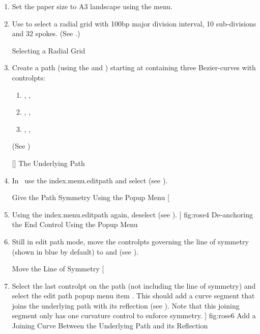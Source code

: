 \begin{enumerate}
  \item Set the paper size to A3 landscape using the
   menu.

  \item Use  to select a
   radial grid with 100\gls{bp} major division interval, 10 sub-divisions and
   32 spokes. (See .)

  {}
  {Selecting a Radial Grid}

  \item Create a \gls{path} (using the 
  and \editpathmode) starting at 
  containing three \glspl{Bezier-curve} with  \glspl{controlpt}:
  \begin{enumerate}
    \item {}, , 
    \item {}, , 
    \item {}, , 
  \end{enumerate}
  (See )

[]
{}
{The Underlying Path}

  \item In \editpathmode\, use the
   \gls{index.menu.editpath} and select 
   (see ).

\FloatSideBySideFigs
[][\setkeys{Gin}{width=\linewidth]}]
{fig:rose3}
{}
{Give the Path Symmetry Using the Popup Menu}
[
     \item Using the \gls{index.menu.editpath} again, deselect
      (see
     ).
]
{fig:rose4}
{}
{De-anchoring the End Control Using the Popup Menu}

  \item Still in edit path mode, move the \glspl{controlpt}
    governing the line of symmetry (shown in blue by default) to
     and  (see ).

{}
{Move the Line of Symmetry}
[
   \item Select the last \gls{controlpt} on the path (not including
     the line of symmetry) and select the edit path popup menu item
     . This should add a curve
     segment that joins the underlying path with its reflection (see
     ). Note that this joining segment only has
    one curvature control to enforce symmetry.
]
{fig:rose6}
{}
{Add a Joining Curve Between the Underlying Path and its
Reflection}


\end{enumerate}
